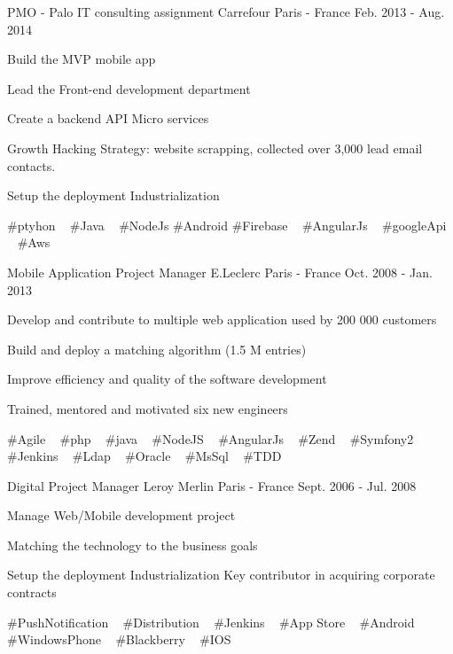 \begin{cventries}
  \cventry
    {PMO - Palo IT consulting assignment} %
    {Carrefour} %
    {Paris - France} %
    {Feb. 2013 - Aug. 2014} %
    {
      \begin{cvitems} %
        \item {Build the MVP mobile app}
        \item {Lead the Front-end development department}
        \item {Create a backend API Micro services}
        \item {Growth Hacking Strategy: website scrapping, collected over 3,000 lead email contacts.}
        \item {Setup the deployment Industrialization}
      \end{cvitems}
    }
    {
      \#ptyhon ~
      \#Java ~
      \#NodeJs
      \#Android
      \#Firebase ~
      \#AngularJs ~
      \#googleApi ~
      \#Aws ~
    }

  \cventry
    {Mobile Application Project Manager} %
    {E.Leclerc} %
    {Paris - France} %
    {Oct. 2008 - Jan. 2013} %
    {
      \begin{cvitems} %
        \item {Develop and contribute to multiple web application used by 200 000 customers}
        \item {Build and deploy a matching algorithm (1.5 M entries)}
        \item {Improve efficiency and quality of the software development}
        \item {Trained, mentored and motivated six new engineers}
      \end{cvitems}
    }
    {
      \#Agile ~
      \#php ~
      \#java ~
      \#NodeJS ~
      \#AngularJs ~
      \#Zend ~
      \#Symfony2 ~
      \#Jenkins ~
      \#Ldap ~
      \#Oracle ~
      \#MsSql ~
      \#TDD
    }

  \cventry
    {Digital Project Manager} %
    {Leroy Merlin} %
    {Paris - France} %
    {Sept. 2006 - Jul. 2008} %
    {
      \begin{cvitems} %
        \item {Manage Web/Mobile development project}
        \item {Matching the technology to the business goals}
        \item {Setup the deployment Industrialization Key contributor in acquiring corporate contracts}
      \end{cvitems}
    }
    {
      \#PushNotification ~
      \#Distribution ~
      \#Jenkins ~
      \#App Store ~
      \#Android ~
      \#WindowsPhone ~
      \#Blackberry ~
      \#IOS
    }

\end{cventries}

